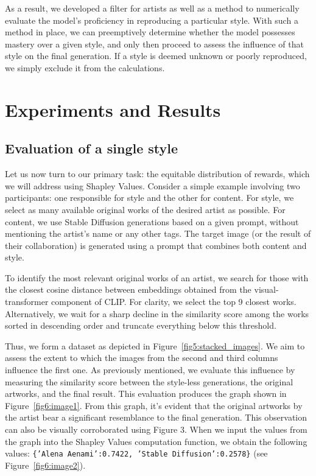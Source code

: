 \documentclass[12pt, letterpaper]{article}
\begin{document}
As a result, we developed a filter for artists as well as a method to numerically evaluate the model's proficiency in reproducing a particular style. With such a method in place, we can preemptively determine whether the model possesses mastery over a given style, and only then proceed to assess the influence of that style on the final generation. If a style is deemed unknown or poorly reproduced, we simply exclude it from the calculations.



\section{Experiments and Results}

\subsection{Evaluation of a single style}
\label{subsec:single_style}

Let us now turn to our primary task: the equitable distribution of rewards, which we will address using Shapley Values. Consider a simple example involving two participants: one responsible for style and the other for content. For style, we select as many available original works of the desired artist as possible. For content, we use Stable Diffusion generations based on a given prompt, without mentioning the artist's name or any other tags. The target image (or the result of their collaboration) is generated using a prompt that combines both content and style.

To identify the most relevant original works of an artist, we search for those with the closest cosine distance between embeddings obtained from the visual-transformer component of CLIP. For clarity, we select the top 9 closest works. Alternatively, we wait for a sharp decline in the similarity score among the works sorted in descending order and truncate everything below this threshold.

Thus, we form a dataset as depicted in Figure~\ref{fig5:stacked_images}. We aim to assess the extent to which the images from the second and third columns influence the first one. As previously mentioned, we evaluate this influence by measuring the similarity score between the style-less generations, the original artworks, and the final result. This evaluation produces the graph shown in Figure~\ref{fig6:image1}. From this graph, it's evident that the original artworks by the artist bear a significant resemblance to the final generation. This observation can also be visually corroborated using Figure 3. When we input the values from the graph into the Shapley Values computation function, we obtain the following values: \texttt{\{'Alena Aenami':0.7422, 'Stable Diffusion':0.2578\}} (see Figure~\ref{fig6:image2}).
\end{document}
